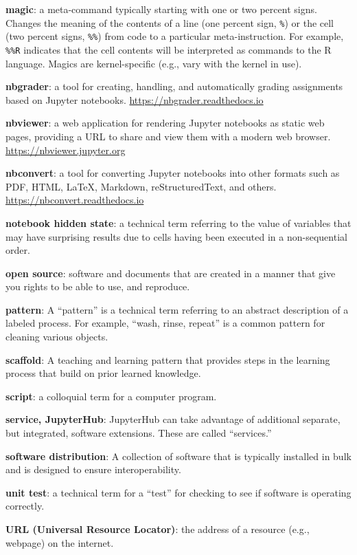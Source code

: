 \documentclass[]{book}
\begin{document}
\textbf{magic}: a meta-command typically starting with one or two
percent signs. Changes the meaning of the contents of a line (one
percent sign, \texttt{\%}) or the cell (two percent signs,
\texttt{\%\%}) from code to a particular meta-instruction. For example,
\texttt{\%\%R} indicates that the cell contents will be interpreted as
commands to the R language. Magics are kernel-specific (e.g., vary with
the kernel in use).

\textbf{nbgrader}: a tool for creating, handling, and automatically
grading assignments based on Jupyter notebooks.
\url{https://nbgrader.readthedocs.io}

\textbf{nbviewer}: a web application for rendering Jupyter notebooks as
static web pages, providing a URL to share and view them with a modern
web browser. \url{https://nbviewer.jupyter.org}

\textbf{nbconvert}: a tool for converting Jupyter notebooks into other
formats such as PDF, HTML, LaTeX, Markdown, reStructuredText, and
others. \url{https://nbconvert.readthedocs.io}

\textbf{notebook hidden state}: a technical term referring to the value
of variables that may have surprising results due to cells having been
executed in a non-sequential order.

\textbf{open source}: software and documents that are created in a
manner that give you rights to be able to use, and reproduce.

\textbf{pattern}: A ``pattern'' is a technical term referring to an
abstract description of a labeled process. For example, ``wash, rinse,
repeat'' is a common pattern for cleaning various objects.

\textbf{scaffold}: A teaching and learning pattern that provides steps
in the learning process that build on prior learned knowledge.

\textbf{script}: a colloquial term for a computer program.

\textbf{service, JupyterHub}: JupyterHub can take advantage of
additional separate, but integrated, software extensions. These are
called ``services.''

\textbf{software distribution}: A collection of software that is
typically installed in bulk and is designed to ensure interoperability.

\textbf{unit test}: a technical term for a ``test'' for checking to see
if software is operating correctly.

\textbf{URL (Universal Resource Locator)}: the address of a resource
(e.g., webpage) on the internet.
\end{document}
